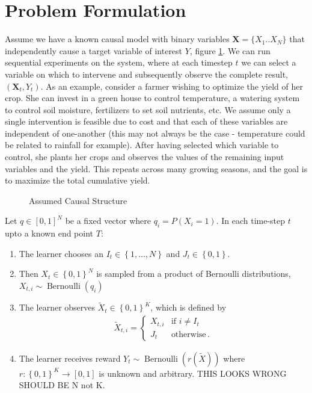 \documentclass{article}
\newcommand{\set}[1]{\left\{#1\right\}}
\newcommand{\eq}[1]{\begin{align*}#1\end{align*}}
\newcommand{\Ber}{\operatorname{Bernoulli}}
\theoremstyle{plain}
\theoremstyle{definition}
\begin{document}
\section*{Problem Formulation}
Assume we have a known causal model with binary variables $\boldsymbol{X} = \{X_{1}..X_{N}\}$ that independently cause a target variable of interest $Y$, figure \ref{fig:causalStructure}. We can run sequential experiments on the system, where at each timestep $t$ we can select a variable on which to intervene and subsequently observe the complete result, $(\boldsymbol{X}_{t},Y_{t})$. As an example, consider a farmer wishing to optimize the yield of her crop. She can invest in a green house to control temperature, a watering system to control soil moisture, fertilizers to set soil nutrients, etc. We assume only a single intervention is feasible due to cost and that each of these variables are independent of one-another (this may not always be the case - temperature could be related to rainfall for example). After having selected which variable to control, she plants her crops and observes the values of the remaining input variables and the yield. This repeats across many growing seasons, and the goal is to maximize the total cumulative yield.

\begin{figure}[h]
\centering
\caption{Assumed Causal Structure}
\label{fig:causalStructure}
\end{figure}


Let $q \in [0,1]^N$ be a fixed vector where $q_i = P(X_i = 1)$. In each time-step $t$ upto a known end point $T$:
 
\begin{enumerate}
\item The learner chooses an $I_t \in \set{1,\ldots, N}$ and $J_t \in \set{0,1}$.
\item Then $X_t \in \set{0,1}^N$ is sampled from a product of Bernoulli distributions, $X_{t,i} \sim \Ber(q_i)$ 
\item The learner observes $\tilde X_t \in \set{0,1}^K$, which is defined by 
\eq{
\tilde X_{t,i} = \begin{cases}
X_{t,i} &\text{if } i \neq I_t \\
J_t & \text{otherwise}\,.
\end{cases}
}
\item The learner receives reward $Y_t \sim \Ber(r(\tilde X))$ where $r:\set{0,1}^K \to [0,1]$ is unknown and arbitrary. THIS LOOKS WRONG SHOULD BE N not K.
\end{enumerate}
\end{document}
